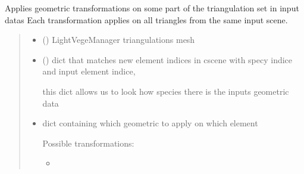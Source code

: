 \documentclass[letterpaper,10pt,english]{sphinxmanual}
\begin{document}
\begin{fulllineitems}
\label{\detokenize{reference:trianglesmesh.apply_transformations}}
\pysigstartsignatures
{}
\pysigstopsignatures
\sphinxAtStartPar
Applies geometric transformations on some part of the triangulation set in input datas
Each transformation applies on all triangles from the same input scene.
\begin{quote}\begin{description}
\begin{itemize}
\item {} 
\sphinxAtStartPar
{} () \textendash{} LightVegeManager triangulations mesh

\item {} 
\sphinxAtStartPar
{} () \textendash{} 
\sphinxAtStartPar
dict that matches new element indices in cscene with specy indice and
input element indice,

\begin{sphinxVerbatim}[commandchars=\\\{\}]
      
\end{sphinxVerbatim}

\sphinxAtStartPar
this dict allows us to look how species there is the inputs geometric data


\item {} 
\sphinxAtStartPar
{} \textendash{} 
\sphinxAtStartPar
dict containing which geometric to apply on which element

\sphinxAtStartPar
Possible transformations:
\begin{itemize}
\item {} 
\sphinxAtStartPar
{}


\end{itemize}
\end{itemize}
\end{description}
\end{quote}
\end{fulllineitems}
\end{document}
